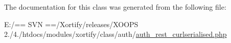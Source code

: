 The documentation for this class was generated from the following file\-:\begin{DoxyCompactItemize}
\item 
E\-:/== S\-V\-N ==/\-Xortify/releases/\-X\-O\-O\-P\-S 2./4./htdocs/modules/xortify/class/auth/\hyperlink{auth__rest__curlserialised_8php}{auth\-\_\-rest\-\_\-curlserialised.\-php}\end{DoxyCompactItemize}
